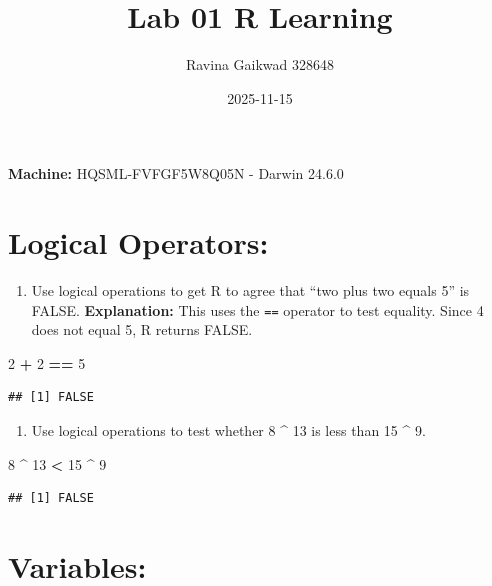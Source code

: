 \documentclass[
]{article}
\title{Lab 01 R Learning}
\author{Ravina Gaikwad 328648}
\date{2025-11-15}
\newenvironment{Shaded}{\begin{snugshade}}{\end{snugshade}}
\newcommand{\DecValTok}[1]{\textcolor[rgb]{0.00,0.00,0.81}{#1}}
\newcommand{\SpecialCharTok}[1]{\textcolor[rgb]{0.81,0.36,0.00}{\textbf{#1}}}
\providecommand{\tightlist}{%
  \setlength{\itemsep}{0pt}\setlength{\parskip}{0pt}}
\begin{document}
\maketitle

\textbf{Machine:} HQSML-FVFGF5W8Q05N - Darwin 24.6.0

\section{Logical Operators:}\label{logical-operators}

\begin{enumerate}
\def\labelenumi{\arabic{enumi}.}
\tightlist
\item
  Use logical operations to get R to agree that ``two plus two equals
  5'' is FALSE. \textbf{Explanation:} This uses the \texttt{==} operator
  to test equality. Since 4 does not equal 5, R returns FALSE.
\end{enumerate}

\begin{Shaded}
\begin{Highlighting}[]
\DecValTok{2} \SpecialCharTok{+} \DecValTok{2} \SpecialCharTok{==} \DecValTok{5}
\end{Highlighting}
\end{Shaded}

\begin{verbatim}
## [1] FALSE
\end{verbatim}

\begin{enumerate}
\def\labelenumi{\arabic{enumi}.}
\setcounter{enumi}{1}
\tightlist
\item
  Use logical operations to test whether 8 \^{} 13 is less than 15 \^{}
  9.
\end{enumerate}

\begin{Shaded}
\begin{Highlighting}[]
\DecValTok{8} \SpecialCharTok{\^{}} \DecValTok{13} \SpecialCharTok{\textless{}} \DecValTok{15} \SpecialCharTok{\^{}} \DecValTok{9}
\end{Highlighting}
\end{Shaded}

\begin{verbatim}
## [1] FALSE
\end{verbatim}

\section{Variables:}\label{variables}
\end{document}
